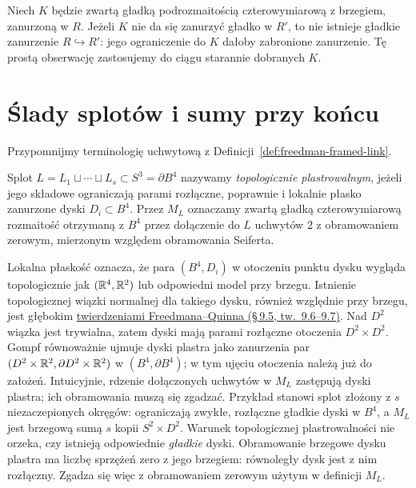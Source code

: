 Niech $K$ będzie zwartą gładką podrozmaitością
czterowymiarową z brzegiem, zanurzoną w $R$.
Jeżeli $K$ nie da się zanurzyć gładko w $R'$, to
nie istnieje gładkie zanurzenie $R\hookrightarrow R'$:
jego ograniczenie do $K$ dałoby zabronione
zanurzenie. Tę prostą obserwację zastosujemy do
ciągu starannie dobranych $K$.

\section{Ślady splotów i sumy przy końcu}
\label{sec:egzotyczne-r4-sploty}

Przypomnijmy terminologię uchwytową z
Definicji~\ref{def:freedman-framed-link}.

\begin{definicja}
\label{def:egzotyczne-r4-slice}
Splot $L=L_1\sqcup\cdots\sqcup L_s\subset S^3=\partial B^4$
nazywamy \emph{topologicznie plastrowalnym}, jeżeli
jego składowe ograniczają parami rozłączne,
poprawnie i lokalnie płasko zanurzone dyski
$D_i\subset B^4$.
Przez $M_L$ oznaczamy zwartą gładką
czterowymiarową rozmaitość otrzymaną z $B^4$
przez dołączenie do $L$ uchwytów $2$ z obramowaniem
zerowym, mierzonym względem obramowania Seiferta.
\end{definicja}

Lokalna płaskość oznacza, że para $(B^4,D_i)$
w otoczeniu punktu dysku wygląda topologicznie
jak $(\mathbb{R}^4,\mathbb{R}^2)$ lub odpowiedni model przy brzegu.
Istnienie topologicznej wiązki normalnej dla takiego
dysku, również względnie przy brzegu, jest głębokim
\href{https://archive.mpim-bonn.mpg.de/4789/2/FreedmanQuinn-TopologyOf4Manifolds-Reformatted2013.pdf}
{twierdzeniami Freedmana--Quinna (\S\,9.5, tw.~9.6--9.7)}.
Nad $D^2$ wiązka jest trywialna, zatem dyski mają
parami rozłączne otoczenia $D^2\times D^2$.
Gompf równoważnie ujmuje dyski plastra jako
zanurzenia par $(D^2\times\mathbb{R}^2,
\partial D^2\times\mathbb{R}^2)$ w $(B^4,\partial B^4)$;
w tym ujęciu otoczenia należą już do założeń.
Intuicyjnie, rdzenie dołączonych uchwytów w $M_L$
zastępują dyski plastra; ich obramowania muszą
się zgadzać. Przykład stanowi splot złożony z $s$
niezaczepionych okręgów: ograniczają zwykłe,
rozłączne gładkie dyski w $B^4$, a $M_L$ jest
brzegową sumą $s$ kopii $S^2\times D^2$.
Warunek topologicznej plastrowalności nie orzeka,
czy istnieją odpowiednie \emph{gładkie} dyski.
Obramowanie brzegowe dysku plastra ma liczbę
sprzężeń zero z jego brzegiem: równoległy dysk
jest z nim rozłączny. Zgadza się więc z
obramowaniem zerowym użytym w definicji $M_L$.

